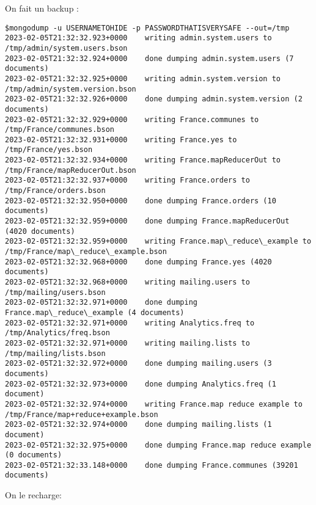 \documentclass{article}
\begin{document}
On fait un backup : 
\begin{lstlisting}
$mongodump -u USERNAMETOHIDE -p PASSWORDTHATISVERYSAFE --out=/tmp
2023-02-05T21:32:32.923+0000	writing admin.system.users to /tmp/admin/system.users.bson
2023-02-05T21:32:32.924+0000	done dumping admin.system.users (7 documents)
2023-02-05T21:32:32.925+0000	writing admin.system.version to /tmp/admin/system.version.bson
2023-02-05T21:32:32.926+0000	done dumping admin.system.version (2 documents)
2023-02-05T21:32:32.929+0000	writing France.communes to /tmp/France/communes.bson
2023-02-05T21:32:32.931+0000	writing France.yes to /tmp/France/yes.bson
2023-02-05T21:32:32.934+0000	writing France.mapReducerOut to /tmp/France/mapReducerOut.bson
2023-02-05T21:32:32.937+0000	writing France.orders to /tmp/France/orders.bson
2023-02-05T21:32:32.950+0000	done dumping France.orders (10 documents)
2023-02-05T21:32:32.959+0000	done dumping France.mapReducerOut (4020 documents)
2023-02-05T21:32:32.959+0000	writing France.map\_reduce\_example to /tmp/France/map\_reduce\_example.bson
2023-02-05T21:32:32.968+0000	done dumping France.yes (4020 documents)
2023-02-05T21:32:32.968+0000	writing mailing.users to /tmp/mailing/users.bson
2023-02-05T21:32:32.971+0000	done dumping France.map\_reduce\_example (4 documents)
2023-02-05T21:32:32.971+0000	writing Analytics.freq to /tmp/Analytics/freq.bson
2023-02-05T21:32:32.971+0000	writing mailing.lists to /tmp/mailing/lists.bson
2023-02-05T21:32:32.972+0000	done dumping mailing.users (3 documents)
2023-02-05T21:32:32.973+0000	done dumping Analytics.freq (1 document)
2023-02-05T21:32:32.974+0000	writing France.map reduce example to /tmp/France/map+reduce+example.bson
2023-02-05T21:32:32.974+0000	done dumping mailing.lists (1 document)
2023-02-05T21:32:32.975+0000	done dumping France.map reduce example (0 documents)
2023-02-05T21:32:33.148+0000	done dumping France.communes (39201 documents)
\end{lstlisting}
On le recharge:
\end{document}
